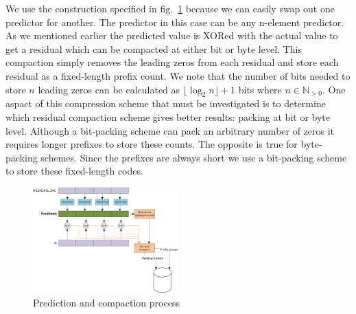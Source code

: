 \documentclass{acm_proc_article-sp}
\begin{document}
We use the construction specified in fig.~\ref{PACKING_ALGORITHM} because we can easily swap out one predictor for another. The predictor in this case can be any n-element predictor. As we mentioned
earlier the predicted value is XORed with the actual value to get a residual which can be compacted at either bit or byte level. This compaction simply removes the leading zeros from each residual and
store each residual as a fixed-length prefix count. We note that the number of bits needed to store $n$ leading zeros can be calculated as $\lfloor\log_2n\rfloor+1$ bits where $n\in\mathbb{N}_{>0}$. One aspact 
of this compression scheme that must be investigated is to determine which residual compaction scheme gives better results: packing at bit or byte level. Although a bit-packing scheme can pack
an arbitrary number of zeros it requires longer prefixes to store these counts. The opposite is true for byte-packing schemes. Since the prefixes are always short we use a bit-packing scheme to store
these fixed-length codes.
\begin{figure}[h!]
 \centering
 \includegraphics[width=0.50\textwidth]{Thesis_Alg.png}
 \caption{Prediction and compaction process}
 \label{PACKING_ALGORITHM}
\end{figure}
\end{document}
